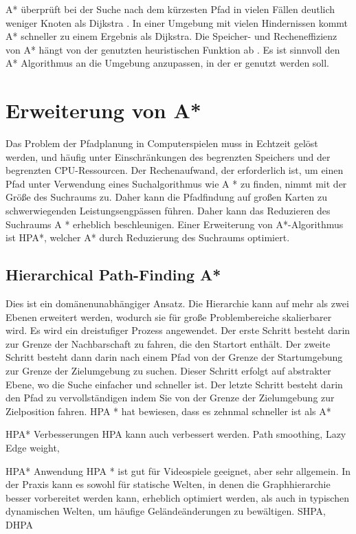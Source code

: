 A* überprüft bei der Suche nach dem kürzesten Pfad in vielen Fällen deutlich weniger Knoten als Dijkstra \cite{Krishnaswamy.2009}. In einer Umgebung mit vielen Hindernissen kommt A* schneller zu einem Ergebnis als Dijkstra. Die Speicher- und Recheneffizienz von A* hängt von der genutzten heuristischen Funktion ab \cite{Noori.2015}. Es ist sinnvoll den A* Algorithmus an die Umgebung anzupassen, in der er genutzt werden soll.

\section{Erweiterung von A*}
Das Problem der Pfadplanung in Computerspielen muss in Echtzeit gelöst werden, und  häufig unter Einschränkungen des begrenzten Speichers und der begrenzten CPU-Ressourcen. Der Rechenaufwand, der erforderlich ist, um einen Pfad unter Verwendung eines Suchalgorithmus wie A * zu finden, nimmt mit der Größe des Suchraums zu. Daher kann die Pfadfindung auf großen Karten zu schwerwiegenden Leistungsengpässen führen. Daher kann das Reduzieren des Suchraums A * erheblich beschleunigen. Einer Erweiterung von A*-Algorithmus ist HPA*, welcher A* durch Reduzierung des Suchraums optimiert\cite{hpa}. %


\subsection{Hierarchical Path-Finding A*}
Dies ist ein domänenunabhängiger Ansatz. Die Hierarchie kann auf mehr als zwei Ebenen erweitert werden, wodurch sie für große Problembereiche skalierbarer wird. Es wird ein dreistufiger Prozess angewendet. Der erste Schritt besteht darin zur Grenze der Nachbarschaft zu fahren, die den Startort enthält. Der zweite Schritt besteht dann darin nach einem Pfad von der Grenze der Startumgebung zur Grenze der Zielumgebung zu suchen. Dieser Schritt erfolgt auf abstrakter Ebene, wo die Suche einfacher und schneller ist. Der letzte Schritt besteht darin den Pfad zu vervollständigen indem Sie von der Grenze der Zielumgebung zur Zielposition fahren. HPA * hat bewiesen, dass es zehnmal schneller ist als A*\cite{hpa}

HPA* Verbesserungen
HPA kann auch verbessert werden. Path smoothing, Lazy Edge weight,

HPA* Anwendung%
HPA * ist gut für Videospiele geeignet, aber sehr allgemein. In der Praxis kann es sowohl für statische Welten, in denen die Graphhierarchie besser vorbereitet werden kann, erheblich optimiert werden, als auch in typischen dynamischen Welten, um häufige Geländeänderungen zu bewältigen. 
SHPA, 
DHPA



